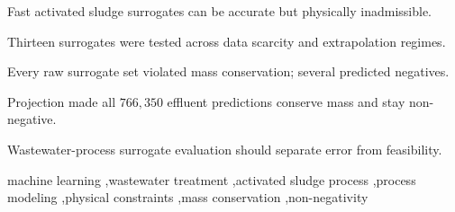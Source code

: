 \documentclass[a4paper,fleqn]{cas-sc}
\begin{document}
\begin{highlights}
\item Fast activated sludge surrogates can be accurate but physically inadmissible.
\item Thirteen surrogates were tested across data scarcity and extrapolation regimes.
\item Every raw surrogate set violated mass conservation; several predicted negatives.
\item Projection made all $766{,}350$ effluent predictions conserve mass and stay non-negative.
\item Wastewater-process surrogate evaluation should separate error from feasibility.
\end{highlights}

\begin{keywords}
machine learning \sep wastewater treatment \sep activated sludge process \sep process modeling \sep physical constraints \sep mass conservation \sep non-negativity
\end{keywords}

\maketitle
\end{document}
